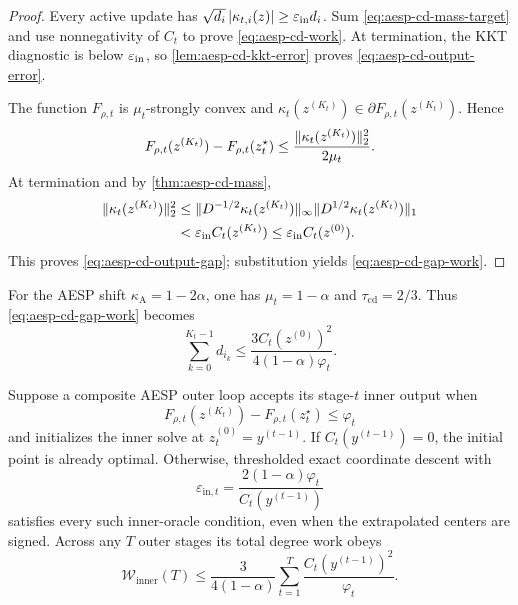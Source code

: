 \begin{proof}
Every active update has
$\sqrt{d_i}\left\lvert \kappa_{t,i}(z) \right\rvert\geq\varepsilon_{\mathrm{in}} d_i$.
Sum \cref{eq:aesp-cd-mass-target} and use nonnegativity of $C_t$ to prove
\cref{eq:aesp-cd-work}.  At termination, the KKT diagnostic is below
$\varepsilon_{\mathrm{in}}$, so \cref{lem:aesp-cd-kkt-error} proves
\cref{eq:aesp-cd-output-error}.

The function $F_{\rho,t}$ is $\mu_t$-strongly convex and
$\kappa_t(z^{(K_t)})\in\partial F_{\rho,t}(z^{(K_t)})$.  Hence
\begin{equation*}
 F_{\rho,t}(z^{(K_t)})-F_{\rho,t}(z_t^\star)
 \leq\frac{\lVert\kappa_t(z^{(K_t)})\rVert_2^2}{2\mu_t}.
\end{equation*}
At termination and by \cref{thm:aesp-cd-mass},
\begin{align*}
 \lVert\kappa_t(z^{(K_t)})\rVert_2^2
 &\leq
 \lVert D^{-1/2}\kappa_t(z^{(K_t)})\rVert_\infty
 \lVert D^{1/2}\kappa_t(z^{(K_t)})\rVert_1\\
 &<\varepsilon_{\mathrm{in}} C_t(z^{(K_t)})
 \leq\varepsilon_{\mathrm{in}} C_t(z^{(0)}).
\end{align*}
This proves \cref{eq:aesp-cd-output-gap}; substitution yields
\cref{eq:aesp-cd-gap-work}.
\end{proof}

For the AESP shift $\kappa_{\mathrm A}=1-2\alpha$, one has
$\mu_t=1-\alpha$ and $\tau_{\mathrm{cd}}=2/3$.  Thus
\cref{eq:aesp-cd-gap-work} becomes
\begin{equation}
 \sum_{k=0}^{K_t-1}d_{i_k}
 \leq
 \frac{3C_t(z^{(0)})^2}{4(1-\alpha)\varphi_t}.
 \label{eq:aesp-cd-specialized-work}
\end{equation}

\begin{corollary}
\label{cor:aesp-cd-plugin}
Suppose a composite AESP outer loop accepts its stage-$t$ inner output when
\begin{equation*}
 F_{\rho,t}(z^{(K_t)})-F_{\rho,t}(z_t^\star)\leq\varphi_t
\end{equation*}
and initializes the inner solve at $z_t^{(0)}=y^{(t-1)}$.  If
$C_t(y^{(t-1)})=0$, the initial point is already optimal.  Otherwise,
thresholded exact coordinate descent with
\begin{equation*}
 \varepsilon_{\mathrm{in},t}
 =\frac{2(1-\alpha)\varphi_t}{C_t(y^{(t-1)})}
\end{equation*}
satisfies every such inner-oracle condition, even when the extrapolated
centers are signed.  Across any $T$ outer stages its total degree work obeys
\begin{equation}
 \mathcal W_{\mathrm{inner}}(T)
 \leq\frac{3}{4(1-\alpha)}
       \sum_{t=1}^T
       \frac{C_t(y^{(t-1)})^2}{\varphi_t}.
 \label{eq:aesp-cd-cumulative-interface}
\end{equation}
\end{corollary}


